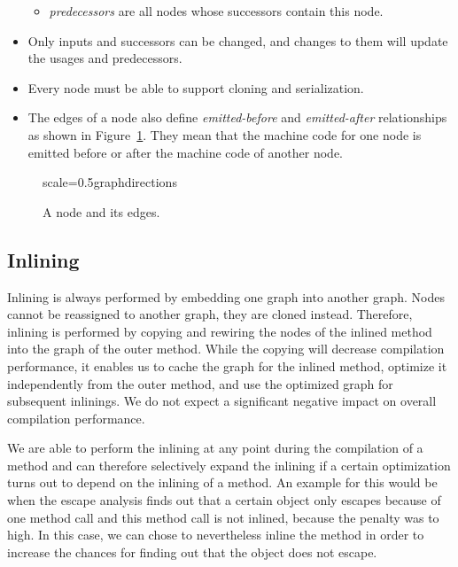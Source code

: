 \documentclass[twocolumn]{svjour3}
\begin{document}
\begin{itemize}
\begin{itemize}
        \item \emph{predecessors} are all nodes whose successors contain this node.
    \end{itemize}
    \item Only inputs and successors can be changed, and changes to them will update the usages and predecessors.
    \item Every node must be able to support cloning and serialization.
    \item The edges of a node also define \textit{emitted-before} and \textit{emitted-after} relationships as shown in Figure~\ref{fig:directions}.
    They mean that the machine code for one node is emitted before or after the machine code of another node.
\end{itemize}

\begin{figure}[ht]
  \centering
\begin{digraphenv}{scale=0.5}{graphdirections}
\end{digraphenv}
  \caption{A node and its edges.}
  \label{fig:directions}
\end{figure}

\subsection{Inlining}
Inlining is always performed by embedding one graph into another graph.
Nodes cannot be reassigned to another graph, they are cloned instead.
Therefore, inlining is performed by copying and rewiring the nodes of the inlined method into the graph of the outer method.
While the copying will decrease compilation performance, it enables us to cache the graph for the inlined method, optimize it independently from the outer method, and use the optimized graph for subsequent inlinings.
We do not expect a significant negative impact on overall compilation performance.

We are able to perform the inlining at any point during the compilation of a method and can therefore selectively expand the inlining if a certain optimization turns out to depend on the inlining of a method.
An example for this would be when the escape analysis finds out that a certain object only escapes because of one method call and this method call is not inlined, because the penalty was to high.
In this case, we can chose to nevertheless inline the method in order to increase the chances for finding out that the object does not escape.
\end{document}
